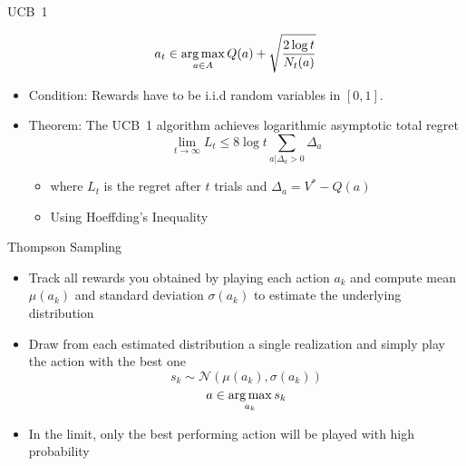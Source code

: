 \documentclass[aspectratio=169]{../latex_main/tntbeamer}  %
\begin{document}
\begin{frame}[c]{UCB~1}
	
			$$a_t \in \operatorname*{arg\,max}_{a \in A} Q(a) + \sqrt{\frac{2\log t }{N_t(a)}} $$
	
	\begin{itemize}

		\item Condition: Rewards have to be i.i.d random variables in $[0,1]$.
		\pause
		\item Theorem: The UCB~1 algorithm achieves logarithmic asymptotic total regret
		$$\lim_{t\to \infty} L_t \leq 8 \log t \sum_{a|\Delta_a>0} \Delta_a $$
		\begin{itemize}
			\item where $L_t$ is the regret after $t$ trials and $\Delta_a = V^* - Q(a)$
			\item Using Hoeffding's Inequality
		\end{itemize}
	\end{itemize}
	
\end{frame}
\begin{frame}[c]{Thompson Sampling}
	
	\begin{itemize}
		\item Track all rewards you obtained by playing each action $a_k$ and compute mean $\mu(a_k)$ and standard deviation $\sigma(a_k)$ to estimate the underlying distribution
		\item Draw from each estimated distribution a single realization and simply play the action with the best one
		$$ s_k \sim \mathcal{N}(\mu(a_k), \sigma(a_k))$$
		$$ a \in \operatorname*{arg\,max}_{a_k} s_k$$
		\item In the limit, only the best performing action will be played with high probability
	\end{itemize}
	
\end{frame}
\end{document}
